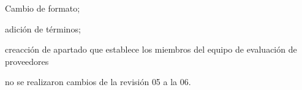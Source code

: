 \begin{changelog}[simple, sectioncmd=\subsection*,label=changelog-2.8]

    \begin{version}[v=2.1, date=2023--01, author=Pablo E. Alanis]
        \item Cambio de formato;
        \item adición de términos;
        \item creacción de apartado que establece los miembros del equipo de evaluación de proveedores
    \end{version}

    \begin{version}[v=1.4, date=2022-02, author=Alonso M.]
        \item no se realizaron cambios de la revisión 05 a la 06.
    \end{version}
\end{changelog}